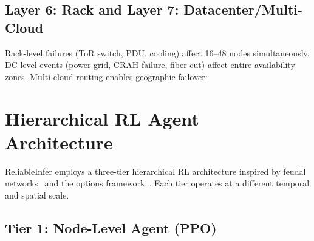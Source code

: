 \documentclass[conference,10pt,letterpaper]{IEEEtran}
\begin{document}
\subsection{Layer 6: Rack and Layer 7: Datacenter/Multi-Cloud}

Rack-level failures (ToR switch, PDU, cooling) affect 16--48 nodes simultaneously. DC-level events (power grid, CRAH failure, fiber cut) affect entire availability zones. Multi-cloud routing enables geographic failover:

\begin{table}[!t]
\caption{Failure Scope and Recovery Strategy}
\label{tab:scope}
\centering\scriptsize
{}
\end{table}

\section{Hierarchical RL Agent Architecture}
\label{sec:rl}

ReliableInfer employs a three-tier hierarchical RL architecture inspired by feudal networks~\cite{vezhnevets2017feudal} and the options framework~\cite{sutton1999options}. Each tier operates at a different temporal and spatial scale.

\subsection{Tier 1: Node-Level Agent (PPO)}
\end{document}
